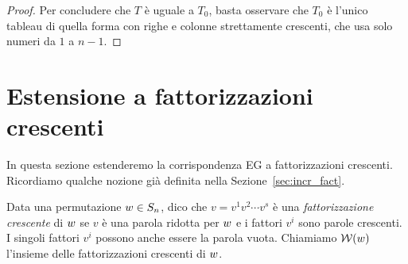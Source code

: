 \begin{proof}


    Per concludere che $T$ \`e uguale a $T_0$, basta osservare che $T_0$ \`e l'unico tableau 
    di quella forma con righe e colonne strettamente crescenti,
    che usa solo numeri da $1$ a $n-1$.
\end{proof}



    


\section{Estensione a fattorizzazioni crescenti}
    
In questa sezione estenderemo la corrispondenza EG a fattorizzazioni crescenti.
Ricordiamo qualche nozione gi\`a definita nella Sezione~\ref{sec:incr_fact}.

Data una permutazione $w \in S_n$, dico che $v = v^1 v^2 \cdots v^s$ \`e una 
\emph{fattorizzazione crescente} di $w$ se $v$ \`e una parola ridotta per $w$ e 
i fattori $v^i$ sono parole crescenti.
I singoli fattori $v^i$ possono anche essere la parola vuota.
Chiamiamo $\operatorname{\mathcal{W}}(w)$ l'insieme delle fattorizzazioni crescenti di $w$.

